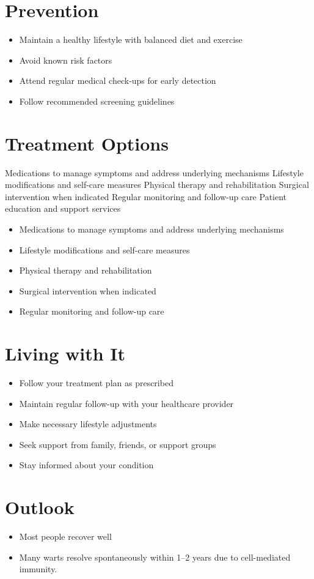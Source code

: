 \section{Prevention}
\begin{itemize}[noitemsep]
  \item Maintain a healthy lifestyle with balanced diet and exercise
  \item Avoid known risk factors
  \item Attend regular medical check-ups for early detection
  \item Follow recommended screening guidelines
\end{itemize}
\section{Treatment Options}
Medications to manage symptoms and address underlying mechanisms Lifestyle modifications and self-care measures Physical therapy and rehabilitation Surgical intervention when indicated Regular monitoring and follow-up care Patient education and support services

\begin{itemize}[noitemsep]
  \item Medications to manage symptoms and address underlying mechanisms
  \item Lifestyle modifications and self-care measures
  \item Physical therapy and rehabilitation
  \item Surgical intervention when indicated
  \item Regular monitoring and follow-up care
\end{itemize}
\section{Living with It}
\begin{itemize}[noitemsep]
  \item Follow your treatment plan as prescribed
  \item Maintain regular follow-up with your healthcare provider
  \item Make necessary lifestyle adjustments
  \item Seek support from family, friends, or support groups
  \item Stay informed about your condition
\end{itemize}
\section{Outlook}
\begin{itemize}[noitemsep]
  \item Most people recover well
  \item Many warts resolve spontaneously within 1--2 years due to cell-mediated immunity.
\end{itemize}
